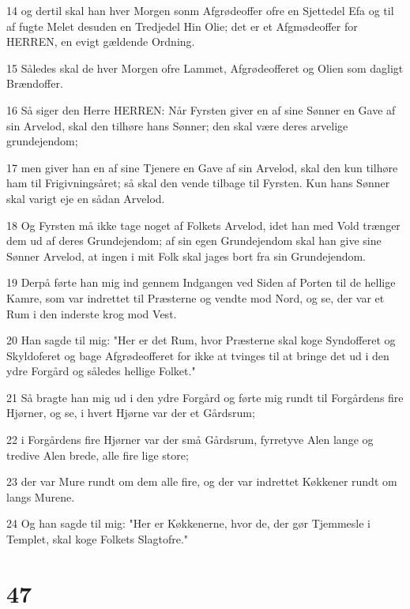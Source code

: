 \par 14 og dertil skal han hver Morgen sonm Afgrødeoffer ofre en Sjettedel Efa og til af fugte Melet desuden en Tredjedel Hin Olie; det er et Afgmødeoffer for HERREN, en evigt gældende Ordning.
\par 15 Således skal de hver Morgen ofre Lammet, Afgrødeofferet og Olien som dagligt Brændoffer.
\par 16 Så siger den Herre HERREN: Når Fyrsten giver en af sine Sønner en Gave af sin Arvelod, skal den tilhøre hans Sønner; den skal være deres arvelige grundejendom;
\par 17 men giver han en af sine Tjenere en Gave af sin Arvelod, skal den kun tilhøre ham til Frigivningsåret; så skal den vende tilbage til Fyrsten. Kun hans Sønner skal varigt eje en sådan Arvelod.
\par 18 Og Fyrsten må ikke tage noget af Folkets Arvelod, idet han med Vold trænger dem ud af deres Grundejendom; af sin egen Grundejendom skal han give sine Sønner Arvelod, at ingen i mit Folk skal jages bort fra sin Grundejendom.
\par 19 Derpå førte han mig ind gennem Indgangen ved Siden af Porten til de hellige Kamre, som var indrettet til Præsterne og vendte mod Nord, og se, der var et Rum i den inderste krog mod Vest.
\par 20 Han sagde til mig: "Her er det Rum, hvor Præsterne skal koge Syndofferet og Skyldoferet og bage Afgrødeofferet for ikke at tvinges til at bringe det ud i den ydre Forgård og således hellige Folket."
\par 21 Så bragte han mig ud i den ydre Forgård og førte mig rundt til Forgårdens fire Hjørner, og se, i hvert Hjørne var der et Gårdsrum;
\par 22 i Forgårdens fire Hjørner var der små Gårdsrum, fyrretyve Alen lange og tredive Alen brede, alle fire lige store;
\par 23 der var Mure rundt om dem alle fire, og der var indrettet Køkkener rundt om langs Murene.
\par 24 Og han sagde til mig: "Her er Køkkenerne, hvor de, der gør Tjemmesle i Templet, skal koge Folkets Slagtofre."

\chapter{47}

